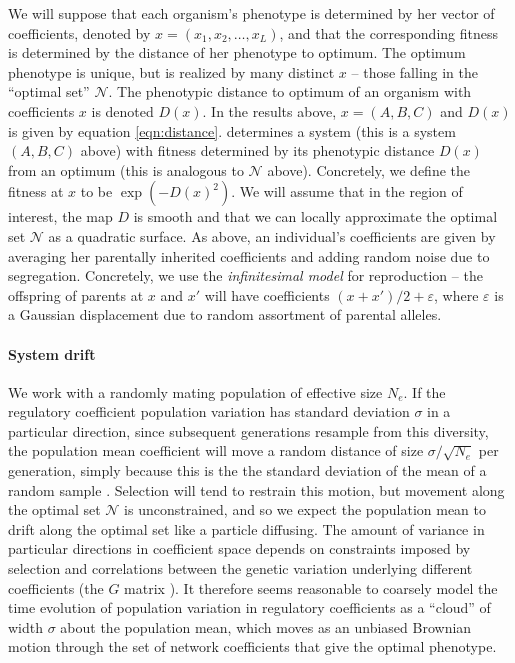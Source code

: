 \documentclass{article}
\newcommand{\1}{\mathbbm{1}}
\newcommand{\allS}{\mathcal{N}}
\begin{document}
We will suppose that each organism's phenotype is determined by her vector of coefficients, denoted by $x=(x_1, x_2, \ldots, x_L)$,
and that the corresponding fitness is determined by the distance of her phenotype to optimum.
The optimum phenotype is unique, but is realized by many distinct $x$ -- those falling in the ``optimal set'' $\allS$.
The phenotypic distance to optimum of an organism with coefficients $x$ is denoted $D(x)$.
In the results above, $x = (A,B,C)$ and $D(x)$ is given by equation \eqref{eqn:distance}.
determines a system (this is a system $(A,B,C)$ above) 
with fitness determined by its phenotypic distance $D(x)$ from an optimum (this is analogous to $\allS$ above). 
Concretely, we define the fitness at $x$ to be $\exp(-D(x)^2)$.
We will assume that in the region of interest, the map $D$ is smooth
and that we can locally approximate the optimal set $\allS$ as a quadratic surface.
As above, an individual's coefficients are given by averaging her parentally inherited coefficients and adding random noise due to segregation. 
Concretely, we use the \emph{infinitesimal model} for reproduction \citep{barton_infinitesimal} --
the offspring of parents at $x$ and $x'$ will have coefficients $(x+x')/2 + \varepsilon$,
where $\varepsilon$ is a Gaussian displacement due to random assortment of parental alleles.

\paragraph{System drift}
We work with a randomly mating population of effective size $N_e$. 
If the regulatory coefficient population variation
has standard deviation $\sigma$ in a particular direction,
since subsequent generations resample from this diversity,
the population mean coefficient will move a random distance of size $\sigma/\sqrt{N_e}$ per generation,
simply because this is the the standard deviation of the mean of a random sample \citep{lande_drift}.
Selection will tend to restrain this motion,
but movement along the optimal set $\allS$ is unconstrained,
and so we expect the population mean to drift along the optimal set like a particle diffusing.
The amount of variance in particular directions in coefficient space 
depends on constraints imposed by selection and 
correlations between the genetic variation underlying different coefficients (the $G$ matrix \citep{G_matrix}).
It therefore seems reasonable to coarsely model the time evolution of population variation in regulatory coefficients as 
a ``cloud'' of width $\sigma$ about the population mean, 
which moves as an unbiased Brownian motion through the set of network coefficients that give the optimal phenotype.
\end{document}
